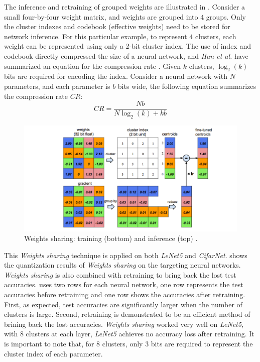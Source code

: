 \documentclass[a4paper,12pt]{report}
\begin{document}
The inference and retraining of grouped weights are illustrated in
.
Consider a small four-by-four weight matrix, and weights are grouped into $4$ groups.
Only the cluster indexes and codebook (effective weights) need to be stored for network inference.
For this particular example, to represent $4$ clusters, each weight can
be represented using only a 2-bit cluster index.
The use of index and codebook directly compressed the size of a neural network, and \textit{Han et al.}
have summarized an equation for the compression rate \cite{Han15}.
Given $k$ clusters, $\log_{2}(k)$ bits are required for encoding the index.
Consider a neural network with $N$ parameters, and each parameter is $b$ bits
wide, the following equation summarizes the compression rate $CR$:
\begin{equation}
CR = \frac{Nb}{N\log_2(k) + kb}
\label{equ:weightsshare_cr}
\end{equation}


\begin{figure}[!h]
\centering
\includegraphics[width=\textwidth]{fig_weights_share.png}
\caption{\label{fig:weights_share}Weights sharing: training (bottom) and inference (top) \cite{Han15}.}
\end{figure}

This \textit{Weights sharing} technique is applied on both \textit{LeNet5} and
\textit{CifarNet}.
 shows the quantization results of \textit{Weights sharing} on
the targeting neural networks.
\textit{Weights sharing} is also combined with retraining to bring back the
lost test accuracies.
 uses two rows for each neural network, one row represents the test accuracies
before retraining and one row shows the accuracies after retraining.
First, as expected, test accuracies are significantly larger when the number of clusters
is large.
Second, retraining is demonstrated to be an efficient method of brining back the
lost accuracies.
\textit{Weights sharing} worked very well on \textit{LeNet5}, with 8 clusters at each
layer, \textit{LeNet5} achieves no accuracy loss after retraining.
It is important to note that, for 8 clusters, only 3 bits are required to
represent the cluster index of each parameter.
\end{document}
